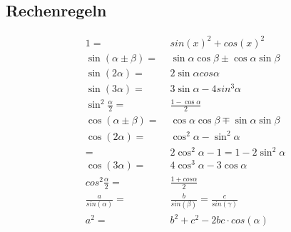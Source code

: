 \subsection{Rechenregeln}
\vspace*{-1em}
    \begin{align*}
        1 =& \; sin(x)^2 + cos(x)^2\\
        \sin(\alpha \pm \beta) =& \; \sin \alpha \cos \beta \pm \cos \alpha \sin \beta\\
        \sin(2 \alpha) =& \; 2 \sin \alpha cos \alpha\\
        \sin(3 \alpha) =& \; 3 \sin \alpha - 4 sin^3 \alpha\\
        \sin^2 \frac{\alpha}{2} =& \; \frac{1 - \cos \alpha}{2}\\
        \cos(\alpha \pm \beta) =& \; \cos \alpha \cos \beta \mp \sin \alpha \sin \beta\\
        \cos(2 \alpha) =& \; \cos^2 \alpha - \sin^2 \alpha\\
        =& \; 2 \cos^2 \alpha - 1 = 1 - 2 \sin^2 \alpha\\
        \cos(3 \alpha) =& \; 4 \cos^3 \alpha - 3 \cos \alpha\\
        cos^2 \frac{\alpha}{2} =& \; \frac{1 + cos \alpha}{2}\\
        \frac{a}{sin(\alpha)} =& \; \frac{b}{sin(\beta)} = \frac{c}{sin(\gamma)}\\
        a^2 =& \; b^2 + c^2 - 2bc \cdot cos(\alpha)
    \end{align*}

